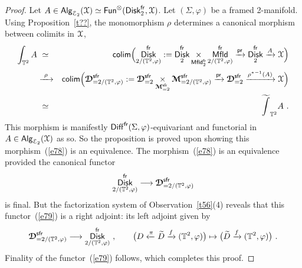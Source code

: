 \documentclass{amsart}
\theoremstyle{definition}
\theoremstyle{remark}
\DeclareMathOperator{\pr}{\mathsf{pr}}
\DeclareMathOperator{\Alg}{\sf Alg}
\DeclareMathOperator{\colim}{{\sf colim}}
\DeclareMathOperator{\Fun}{{\sf Fun}}
\DeclareMathOperator{\Diff}{{\sf Diff}}
\DeclareMathOperator{\Mfld}{{\sf Mfld}}
\DeclareMathOperator{\Disk}{{\sf Disk}}
\DeclareMathOperator{\fr}{\sf fr}
\DeclareMathOperator{\sfr}{\sf sfr}
\def\ot{\otimes}
\newcommand{\w}{\widetilde}
\newcommand{\xra}{\xrightarrow}
\newcommand{\xla}{\xleftarrow}
\def\cE{\mathcal E}\def\cF{\mathcal F}\def\cG{\mathcal G}\def\cH{\mathcal H}
\def\bcD{\boldsymbol{\mathcal D}}\def\bcE{\boldsymbol{\mathcal E}}\def\bcF{\boldsymbol{\mathcal F}}
\def\bcM{\boldsymbol{\mathcal M}}\def\bcN{\boldsymbol{\mathcal N}}\def\bcO{\boldsymbol{\mathcal O}}\def\bcP{\boldsymbol{\mathcal P}}\def\bcQ{\boldsymbol{\mathcal Q}}\def\bcR{\boldsymbol{\mathcal R}}
\def\bcM{\boldsymbol{\mathcal M}}
\begin{document}
\begin{proof}
Let $A\in \Alg_{\cE_2}(\cX)\simeq \Fun^{\ot}(\Disk_2^{\fr} , \cX)$.
Let $(\Sigma,\varphi)$ be a framed 2-manifold.
Using Proposition~\ref{t??}, the monomorphism $\rho$ determines a canonical morphism between colimits in $\mathcal X$,
\begin{eqnarray}
\label{e78}
\int_{\TT^2} A
&
~\simeq~
&
\colim
\Bigl(
\Disk_{2/(\TT^2,\varphi)}^{\fr}:=
\Disk_2^{\fr} \underset{\Mfld_2^{\fr}}\times \Mfld_{2/(\TT^2,\varphi)}^{\fr}
\xra{\pr}
\Disk_2^{\fr}
\xra{A}
\cX
\Bigr)
\\
\nonumber
&
\xra{~\rho~}
&
\colim
\Bigl(
\bcD_{=2/(\TT^2,\varphi)}^{\sfr}:=
\bcD_{=2}^{\sfr} \underset{\bcM_{=2}^{\sfr}}\times \bcM_{=2/(\TT^2,\varphi)}^{\sfr}
\xra{\pr}
\bcD_{=2}^{\sfr}
\xra{{\rho^\ast}^{-1}(A)}
\cX
\Bigr)
\\
\nonumber
&
~\simeq~
&
\w{\int}_{\TT^2} A
~.
\end{eqnarray}
This morphism is manifestly $\Diff^{\fr}(\Sigma,\varphi)$-equivariant and functorial in $A\in \Alg_{\cE_2}(\cX)$ as so.
So the proposition is proved upon showing this morphism~(\ref{e78}) is an equivalence.
The morphism~(\ref{e78}) is an equivalence provided the canonical functor
\begin{equation}
\label{e79}
\Disk_{2/(\TT^2,\varphi)}^{\fr}
\longrightarrow
\bcD_{=2/(\TT^2,\varphi)}^{\sfr}
\end{equation}
is final.
But the factorization system of Observation~\ref{t56}(4) reveals that this functor~(\ref{e79}) is a right adjoint: its left adjoint given by 
\[
\bcD_{=2/(\TT^2,\varphi)}^{\sfr}
\longrightarrow
\Disk_{2/(\TT^2,\varphi)}^{\fr}
~,\qquad
\bigl(D \xla{\pi} \w{D} \xra{f} (\TT^2,\varphi) \bigr)
\mapsto
\bigl(
\w{D} \xra{f} (\TT^2,\varphi)
\bigr)
~.
\]
Finality of the functor~(\ref{e79}) follows, which completes this proof.




\end{proof}
\end{document}

